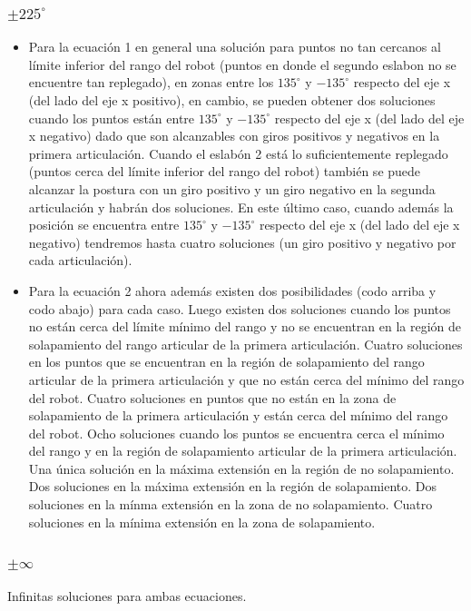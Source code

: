 \documentclass[a4paper,12pt]{article}
\begin{document}
\subsubsection{$\pm 225^\circ$}

\begin{itemize}
    \item Para la ecuación 1 en general una solución para puntos no tan cercanos al límite inferior del rango del robot (puntos en donde el segundo eslabon no se encuentre tan replegado), en zonas entre los $135^\circ$ y $-135^\circ$ respecto del eje x (del lado del eje x positivo), en cambio, se pueden obtener dos soluciones cuando los puntos están entre $135^\circ$ y $-135^\circ$ respecto del eje x (del lado del eje x negativo) dado que son alcanzables con giros positivos y negativos en la primera articulación. Cuando
    el eslabón 2 está lo suficientemente replegado (puntos cerca del límite inferior del rango del robot) también se puede alcanzar la postura con un giro positivo y un giro negativo en la segunda articulación y habrán dos soluciones. En este último caso, cuando además la posición se encuentra entre $135^\circ$ y $-135^\circ$ respecto del eje x (del lado del eje x negativo) tendremos hasta cuatro soluciones (un giro positivo y negativo por cada articulación).
    \item Para la ecuación 2 ahora además existen dos posibilidades (codo arriba y codo abajo) para cada caso. Luego existen dos soluciones cuando los puntos no están cerca del límite mínimo del rango y no se encuentran en la región de solapamiento del rango articular de la primera articulación. Cuatro soluciones en los puntos que se encuentran en la región de solapamiento del rango articular de la primera articulación y que no están cerca del mínimo del rango del robot. Cuatro soluciones en puntos que no están en la zona de solapamiento de la primera articulación y están cerca del mínimo del rango del robot. Ocho soluciones cuando los puntos se encuentra cerca el mínimo del rango y en la región de solapamiento articular de la primera articulación. Una única solución en la máxima extensión en la región de no solapamiento. Dos soluciones en la máxima extensión en la región de solapamiento. Dos soluciones en la mínma extensión en la zona de no solapamiento. Cuatro soluciones en la mínima extensión en la zona de solapamiento.
\end{itemize}

\subsubsection{$\pm \infty$}
Infinitas soluciones para ambas ecuaciones.
\end{document}
